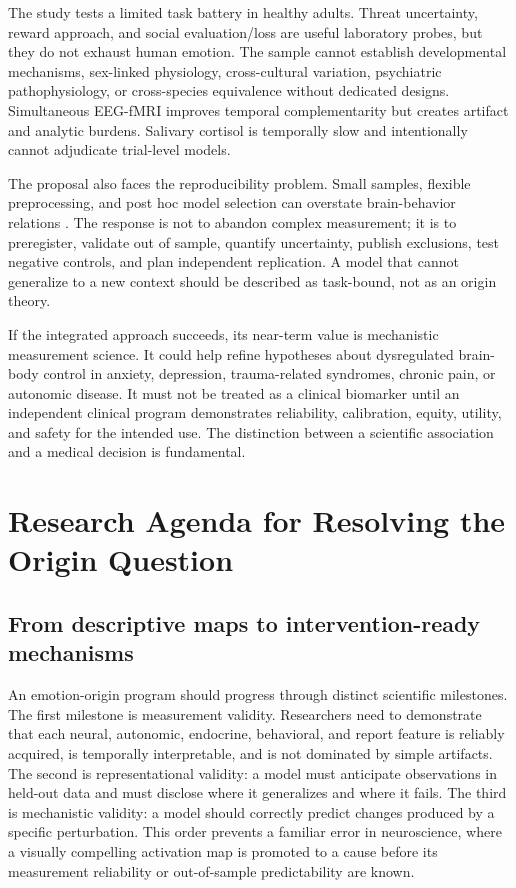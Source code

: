 \documentclass[conference]{IEEEtran}
\begin{document}
The study tests a limited task battery in healthy adults. Threat uncertainty, reward approach, and social evaluation/loss are useful laboratory probes, but they do not exhaust human emotion. The sample cannot establish developmental mechanisms, sex-linked physiology, cross-cultural variation, psychiatric pathophysiology, or cross-species equivalence without dedicated designs. Simultaneous EEG-fMRI improves temporal complementarity but creates artifact and analytic burdens. Salivary cortisol is temporally slow and intentionally cannot adjudicate trial-level models.

The proposal also faces the reproducibility problem. Small samples, flexible preprocessing, and post hoc model selection can overstate brain-behavior relations \cite{Button2013}. The response is not to abandon complex measurement; it is to preregister, validate out of sample, quantify uncertainty, publish exclusions, test negative controls, and plan independent replication. A model that cannot generalize to a new context should be described as task-bound, not as an origin theory.

If the integrated approach succeeds, its near-term value is mechanistic measurement science. It could help refine hypotheses about dysregulated brain-body control in anxiety, depression, trauma-related syndromes, chronic pain, or autonomic disease. It must not be treated as a clinical biomarker until an independent clinical program demonstrates reliability, calibration, equity, utility, and safety for the intended use. The distinction between a scientific association and a medical decision is fundamental.

\section{Research Agenda for Resolving the Origin Question}

\subsection{From descriptive maps to intervention-ready mechanisms}

An emotion-origin program should progress through distinct scientific milestones. The first milestone is measurement validity. Researchers need to demonstrate that each neural, autonomic, endocrine, behavioral, and report feature is reliably acquired, is temporally interpretable, and is not dominated by simple artifacts. The second is representational validity: a model must anticipate observations in held-out data and must disclose where it generalizes and where it fails. The third is mechanistic validity: a model should correctly predict changes produced by a specific perturbation. This order prevents a familiar error in neuroscience, where a visually compelling activation map is promoted to a cause before its measurement reliability or out-of-sample predictability are known.
\end{document}
